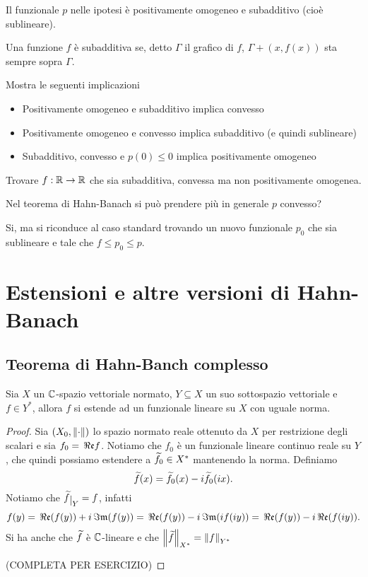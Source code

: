 Il funzionale $p$ nelle ipotesi \`e positivamente omogeneo e subadditivo (cio\`e sublineare).

\begin{remark}
Una funzione $f$ \`e subadditiva se, detto $\Gamma$ il grafico di $f$, $\Gamma+(x,f(x))$ sta sempre sopra $\Gamma$.
\end{remark}

\begin{exercise}
Mostra le seguenti implicazioni
\begin{itemize}
    \item Positivamente omogeneo e subadditivo implica convesso
    \item Positivamente omogeneo e convesso implica subadditivo (e quindi sublineare)
    \item Subadditivo, convesso e $p(0)\leq 0$ implica positivamente omogeneo
\end{itemize}
\end{exercise}

\begin{exercise}
Trovare $f:\mathbb{R}\to \mathbb{R}$ che sia subadditiva, convessa ma non positivamente omogenea.
\end{exercise}

\begin{exercise}
Nel teorema di Hahn-Banach si pu\`o prendere pi\`u in generale $p$ convesso?

Si, ma si riconduce al caso standard trovando un nuovo funzionale $p_0$ che sia sublineare e tale che $f\leq p_0\leq p$.
\end{exercise}

\section{Estensioni e altre versioni di Hahn-Banach}

\subsection{Teorema di Hahn-Banch complesso}
\begin{theorem}\label{ThHahnBanachComplesso}
    Sia $X$ un $\mathbb{C}$-spazio vettoriale normato, $Y\subseteq X$ un suo sottospazio vettoriale e $f\in Y^\ast$, allora $f$ si estende ad un funzionale lineare su $X$ con uguale norma.
\end{theorem}
\begin{proof}
Sia $(X_0,\left\Vert{\cdot}\right\Vert)$ lo spazio normato reale ottenuto da $X$ per restrizione degli scalari e sia $f_0=\,\Re\mathfrak{e} f$. Notiamo che $f_0$ \`e un funzionale lineare continuo reale su $Y$, che quindi possiamo estendere a $\widetilde{f}_0\in X^\ast$ mantenendo la norma. Definiamo \[\widetilde{f}(x)=\widetilde{f}_0(x)-i\widetilde{f}_0(ix).\]
Notiamo che $\wt f\res Y=f$, infatti 
\[f(y)=\,\Re\mathfrak{e}(f(y))+i\,\Im\mathfrak{m}(f(y))=\,\Re\mathfrak{e}(f(y))-i\,\Im\mathfrak{m}(if(iy))=\,\Re\mathfrak{e}(f(y))-i\,\Re\mathfrak{e}(f(iy)).\]
Si ha anche che $\widetilde{f}$ \`e $\mathbb{C}$-lineare e che $\left\Vert{\widetilde{f}}\right\Vert_{X^\ast}=\left\Vert{f}\right\Vert_{Y^\ast}$

(COMPLETA PER ESERCIZIO)
\end{proof}






